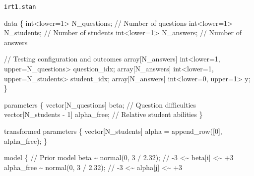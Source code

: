 \documentclass[
  letterpaper,
  DIV=11,
  numbers=noendperiod]{scrartcl}
\newenvironment{Shaded}{\begin{snugshade}}{\end{snugshade}}
\newcommand{\CommentTok}[1]{\textcolor[rgb]{0.37,0.37,0.37}{#1}}
\newcommand{\DataTypeTok}[1]{\textcolor[rgb]{0.68,0.00,0.00}{#1}}
\newcommand{\DecValTok}[1]{\textcolor[rgb]{0.68,0.00,0.00}{#1}}
\newcommand{\FloatTok}[1]{\textcolor[rgb]{0.68,0.00,0.00}{#1}}
\newcommand{\KeywordTok}[1]{\textcolor[rgb]{0.00,0.23,0.31}{#1}}
\newcommand{\NormalTok}[1]{\textcolor[rgb]{0.00,0.23,0.31}{#1}}
\begin{document}
\begin{codelisting}

\caption{\texttt{irt1.stan}}

\begin{Shaded}
\begin{Highlighting}[]
\KeywordTok{data}\NormalTok{ \{}
  \DataTypeTok{int}\NormalTok{\textless{}}\KeywordTok{lower}\NormalTok{=}\DecValTok{1}\NormalTok{\textgreater{} N\_questions; }\CommentTok{// Number of questions}
  \DataTypeTok{int}\NormalTok{\textless{}}\KeywordTok{lower}\NormalTok{=}\DecValTok{1}\NormalTok{\textgreater{} N\_students;  }\CommentTok{// Number of students}
  \DataTypeTok{int}\NormalTok{\textless{}}\KeywordTok{lower}\NormalTok{=}\DecValTok{1}\NormalTok{\textgreater{} N\_answers;   }\CommentTok{// Number of answers}

  \CommentTok{// Testing configuration and outcomes}
  \DataTypeTok{array}\NormalTok{[N\_answers] }\DataTypeTok{int}\NormalTok{\textless{}}\KeywordTok{lower}\NormalTok{=}\DecValTok{1}\NormalTok{, }\KeywordTok{upper}\NormalTok{=N\_questions\textgreater{} question\_idx;}
  \DataTypeTok{array}\NormalTok{[N\_answers] }\DataTypeTok{int}\NormalTok{\textless{}}\KeywordTok{lower}\NormalTok{=}\DecValTok{1}\NormalTok{, }\KeywordTok{upper}\NormalTok{=N\_students\textgreater{}  student\_idx;}
  \DataTypeTok{array}\NormalTok{[N\_answers] }\DataTypeTok{int}\NormalTok{\textless{}}\KeywordTok{lower}\NormalTok{=}\DecValTok{0}\NormalTok{, }\KeywordTok{upper}\NormalTok{=}\DecValTok{1}\NormalTok{\textgreater{} y;}
\NormalTok{\}}

\KeywordTok{parameters}\NormalTok{ \{}
  \DataTypeTok{vector}\NormalTok{[N\_questions]    beta;       }\CommentTok{// Question difficulties}
  \DataTypeTok{vector}\NormalTok{[N\_students {-} }\DecValTok{1}\NormalTok{] alpha\_free; }\CommentTok{// Relative student abilities}
\NormalTok{\}}

\KeywordTok{transformed parameters}\NormalTok{ \{}
  \DataTypeTok{vector}\NormalTok{[N\_students] alpha = append\_row([}\DecValTok{0}\NormalTok{]\textquotesingle{}, alpha\_free);}
\NormalTok{\}}

\KeywordTok{model}\NormalTok{ \{}
  \CommentTok{// Prior model}
\NormalTok{  beta       \textasciitilde{} normal(}\DecValTok{0}\NormalTok{, }\DecValTok{3}\NormalTok{ / }\FloatTok{2.32}\NormalTok{); }\CommentTok{// {-}3 \textless{}\textasciitilde{}  beta[i] \textless{}\textasciitilde{} +3}
\NormalTok{  alpha\_free \textasciitilde{} normal(}\DecValTok{0}\NormalTok{, }\DecValTok{3}\NormalTok{ / }\FloatTok{2.32}\NormalTok{); }\CommentTok{// {-}3 \textless{}\textasciitilde{} alpha[j] \textless{}\textasciitilde{} +3}


\end{Highlighting}
\end{Shaded}
\end{codelisting}
\end{document}
